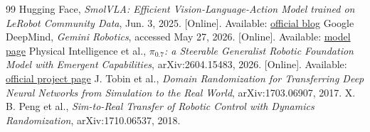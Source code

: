 \begin{thebibliography}{99}
 Hugging Face, \emph{SmolVLA: Efficient Vision-Language-Action Model trained on LeRobot Community Data}, Jun. 3, 2025. [Online]. Available: \href{https://huggingface.co/blog/smolvla}{official blog}
 Google DeepMind, \emph{Gemini Robotics}, accessed May 27, 2026. [Online]. Available: \href{https://deepmind.google/models/gemini-robotics/}{model page}
 Physical Intelligence et al., \emph{$\pi_{0.7}$: a Steerable Generalist Robotic Foundation Model with Emergent Capabilities}, arXiv:2604.15483, 2026. [Online]. Available: \href{https://www.pi.website/blog/pi07}{official project page}
 J. Tobin et al., \emph{Domain Randomization for Transferring Deep Neural Networks from Simulation to the Real World}, arXiv:1703.06907, 2017.
 X. B. Peng et al., \emph{Sim-to-Real Transfer of Robotic Control with Dynamics Randomization}, arXiv:1710.06537, 2018.
\end{thebibliography}
